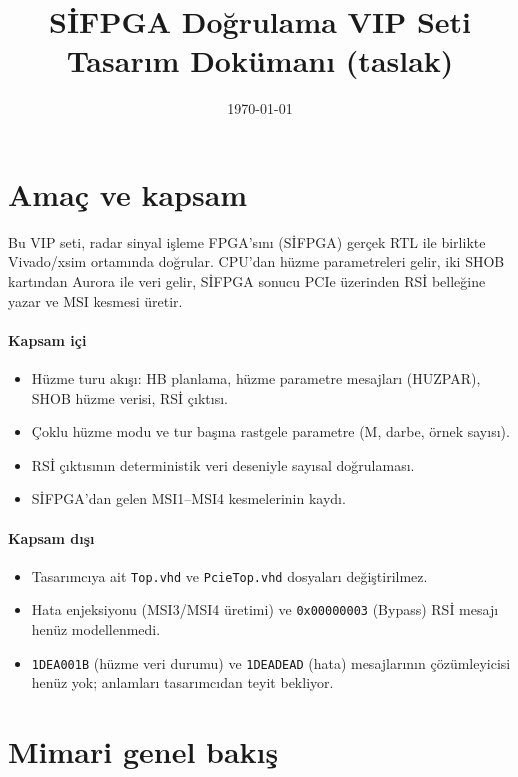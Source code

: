 \documentclass[11pt,a4paper]{article}
\title{\textbf{SİFPGA Doğrulama VIP Seti}\\[0.3em]
       \large Tasarım Dokümanı (taslak)}
\author{}
\date{\today}
\newcommand{\kod}[1]{\texttt{#1}}
\begin{document}
\maketitle
\tableofcontents
\newpage

\section{Amaç ve kapsam}

Bu VIP seti, radar sinyal işleme FPGA'sını (SİFPGA) gerçek RTL ile birlikte
Vivado/xsim ortamında doğrular. CPU'dan hüzme parametreleri gelir, iki SHOB
kartından Aurora ile veri gelir, SİFPGA sonucu PCIe üzerinden RSİ belleğine
yazar ve MSI kesmesi üretir.

\paragraph{Kapsam içi}
\begin{itemize}[nosep]
  \item Hüzme turu akışı: HB planlama, hüzme parametre mesajları (HUZPAR),
        SHOB hüzme verisi, RSİ çıktısı.
  \item Çoklu hüzme modu ve tur başına rastgele parametre (M, darbe, örnek sayısı).
  \item RSİ çıktısının deterministik veri deseniyle sayısal doğrulaması.
  \item SİFPGA'dan gelen MSI1--MSI4 kesmelerinin kaydı.
\end{itemize}

\paragraph{Kapsam dışı}
\begin{itemize}[nosep]
  \item Tasarımcıya ait \kod{Top.vhd} ve \kod{PcieTop.vhd} dosyaları değiştirilmez.
  \item Hata enjeksiyonu (MSI3/MSI4 üretimi) ve \kod{0x00000003} (Bypass) RSİ
        mesajı henüz modellenmedi.
  \item \kod{1DEA001B} (hüzme veri durumu) ve \kod{1DEADEAD} (hata) mesajlarının
        çözümleyicisi henüz yok; anlamları tasarımcıdan teyit bekliyor.
\end{itemize}

\section{Mimari genel bakış}
\end{document}
